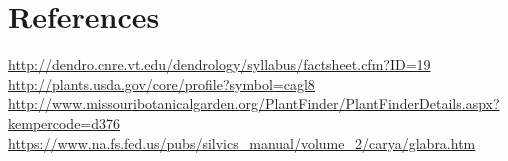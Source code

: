 \documentclass{article}\usepackage[]{graphicx}\usepackage[]{color}
\begin{document}
\section{References}
\url{http://dendro.cnre.vt.edu/dendrology/syllabus/factsheet.cfm?ID=19} \\
\url{http://plants.usda.gov/core/profile?symbol=cagl8} \\
\url{http://www.missouribotanicalgarden.org/PlantFinder/PlantFinderDetails.aspx?kempercode=d376} \\
\url{https://www.na.fs.fed.us/pubs/silvics_manual/volume_2/carya/glabra.htm} \\
\end{document}
